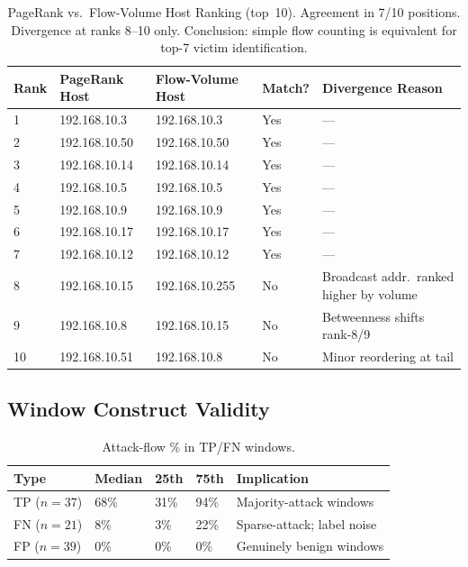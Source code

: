 \documentclass[journal,10pt,twoside]{IEEEtran}
\begin{document}
\begin{table}[!t]
\caption{PageRank vs.\ Flow-Volume Host Ranking (top~10).
  Agreement in 7/10 positions. Divergence at ranks 8--10 only.
  Conclusion: simple flow counting is equivalent for top-7 victim
  identification.}
\label{tab:pagerank}
\centering\small
\begin{tabular}{@{}P{0.55cm}P{2.05cm}P{2.25cm}P{0.95cm}L{4.3cm}@{}}
\toprule
\textbf{Rank} & \textbf{PageRank Host}
  & \textbf{Flow-Volume Host}
  & \textbf{Match?} & \textbf{Divergence Reason} \\
  & 192.168.10.3  & 192.168.10.3   & Yes & --- \\
2  & 192.168.10.50 & 192.168.10.50  & Yes & --- \\
3  & 192.168.10.14 & 192.168.10.14  & Yes & --- \\
4  & 192.168.10.5  & 192.168.10.5   & Yes & --- \\
5  & 192.168.10.9  & 192.168.10.9   & Yes & --- \\
6  & 192.168.10.17 & 192.168.10.17  & Yes & --- \\
7  & 192.168.10.12 & 192.168.10.12  & Yes & --- \\
8  & 192.168.10.15 & 192.168.10.255 & No
  & Broadcast addr.\ ranked higher by volume \\
9  & 192.168.10.8  & 192.168.10.15  & No
  & Betweenness shifts rank-8/9 \\
10 & 192.168.10.51 & 192.168.10.8   & No
  & Minor reordering at tail \\
\bottomrule
\end{tabular}
\end{table}

\subsection{Window Construct Validity}

\begin{table}[!t]
\caption{Attack-flow \% in TP/FN windows.}
\label{tab:validity}
\centering\small
\begin{tabular}{@{}L{1.55cm}P{1.15cm}P{0.75cm}P{0.75cm}L{2.75cm}@{}}
\toprule
\textbf{Type} & \textbf{Median} & \textbf{25th}
  & \textbf{75th} & \textbf{Implication} \\
\midrule
TP ($n{=}37$) & 68\% & 31\% & 94\% & Majority-attack windows \\
FN ($n{=}21$) &  8\% &  3\% & 22\% & Sparse-attack; label noise \\
FP ($n{=}39$) &  0\% &  0\% &  0\% & Genuinely benign windows \\
\bottomrule
\end{tabular}
\end{table}
\end{document}
